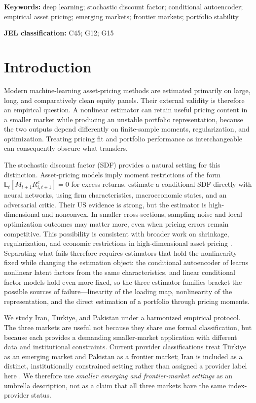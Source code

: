 \documentclass[12pt]{article}
\begin{document}
\vspace{0.75em}
\noindent\textbf{Keywords:} deep learning; stochastic discount factor; conditional autoencoder; empirical asset pricing; emerging markets; frontier markets; portfolio stability

\noindent\textbf{JEL classification:} C45; G12; G15

\section{Introduction}\label{sec:intro}

Modern machine-learning asset-pricing methods are estimated primarily on large, long, and comparatively clean equity panels. Their external validity is therefore an empirical question. A nonlinear estimator can retain useful pricing content in a smaller market while producing an unstable portfolio representation, because the two outputs depend differently on finite-sample moments, regularization, and optimization. Treating pricing fit and portfolio performance as interchangeable can consequently obscure what transfers.

The stochastic discount factor (SDF) provides a natural setting for this distinction. Asset-pricing models imply moment restrictions of the form $\mathbb{E}_t[M_{t+1}R^e_{i,t+1}]=0$ for excess returns. \citet{cpz2024} estimate a conditional SDF directly with neural networks, using firm characteristics, macroeconomic states, and an adversarial critic. Their US evidence is strong, but the estimator is high-dimensional and nonconvex. In smaller cross-sections, sampling noise and local optimization outcomes may matter more, even when pricing errors remain competitive. This possibility is consistent with broader work on shrinkage, regularization, and economic restrictions in high-dimensional asset pricing \citep{kps2019,kns2020,bagnara2024}. Separating what fails therefore requires estimators that hold the nonlinearity fixed while changing the estimation object: the conditional autoencoder of \citet{gkx2021} learns nonlinear latent factors from the same characteristics, and linear conditional factor models \citep{kps2019} hold even more fixed, so the three estimator families bracket the possible sources of failure---linearity of the loading map, nonlinearity of the representation, and the direct estimation of a portfolio through pricing moments.

We study Iran, T\"urkiye, and Pakistan under a harmonized empirical protocol. The three markets are useful not because they share one formal classification, but because each provides a demanding smaller-market application with different data and institutional constraints. Current provider classifications treat T\"urkiye as an emerging market and Pakistan as a frontier market; Iran is included as a distinct, institutionally constrained setting rather than assigned a provider label here \citep{msci2026,ftse2024}. We therefore use \emph{smaller emerging and frontier-market settings} as an umbrella description, not as a claim that all three markets have the same index-provider status.
\end{document}
